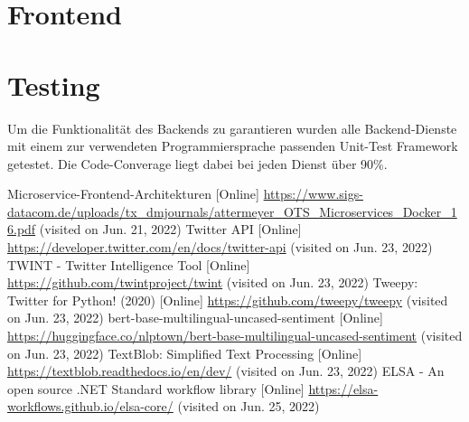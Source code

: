 \documentclass[conference]{IEEEtran}
\begin{document}
\section{Frontend}

\section{Testing}
Um die Funktionalität des Backends zu garantieren wurden alle Backend-Dienste mit einem zur verwendeten Programmiersprache passenden Unit-Test Framework getestet.
Die Code-Converage liegt dabei bei jeden Dienst über 90\%. 

\begin{thebibliography}{0}
    Microservice-Frontend-Architekturen [Online] \url{https://www.sigs-datacom.de/uploads/tx_dmjournals/attermeyer_OTS_Microservices_Docker_16.pdf} (visited on Jun. 21, 2022)
    Twitter API [Online] \url{https://developer.twitter.com/en/docs/twitter-api} (visited on Jun. 23, 2022)
    TWINT - Twitter Intelligence Tool [Online] \url{https://github.com/twintproject/twint} (visited on Jun. 23, 2022)
    Tweepy: Twitter for Python! (2020) [Online] \url{https://github.com/tweepy/tweepy} (visited on Jun. 23, 2022)
    bert-base-multilingual-uncased-sentiment [Online] \url{https://huggingface.co/nlptown/bert-base-multilingual-uncased-sentiment} (visited on Jun. 23, 2022)
    TextBlob: Simplified Text Processing [Online] \url{https://textblob.readthedocs.io/en/dev/} (visited on Jun. 23, 2022)
    ELSA - An open source .NET Standard workflow library [Online] \url{https://elsa-workflows.github.io/elsa-core/} (visited on Jun. 25, 2022)
\end{thebibliography}
\end{document}
